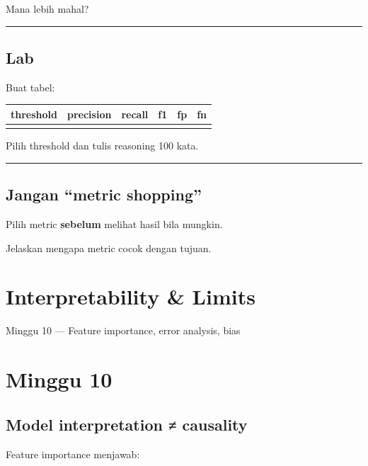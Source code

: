 \documentclass[
  indonesian,
  letterpaper,
  DIV=11,
  numbers=noendperiod]{scrreprt}
\newcounter{none} %
\begin{document}
Mana lebih mahal?

\begin{center}\rule{0.5\linewidth}{0.5pt}\end{center}

\section{Lab}\label{lab-5}

Buat tabel:

{\def\LTcaptype{none} %
\begin{longtable}[]{@{}rrrrrr@{}}
\toprule\noalign{}
threshold & precision & recall & f1 & fp & fn \\
\midrule\noalign{}
\endhead
\bottomrule\noalign{}
\endlastfoot
\end{longtable}
}

Pilih threshold dan tulis reasoning 100 kata.

\begin{center}\rule{0.5\linewidth}{0.5pt}\end{center}

\section{Jangan ``metric shopping''}\label{jangan-metric-shopping}

Pilih metric \textbf{sebelum} melihat hasil bila mungkin.

Jelaskan mengapa metric cocok dengan tujuan.

\chapter{Interpretability \& Limits}\label{interpretability-limits}

Minggu 10 --- Feature importance, error analysis, bias

\hfill\break

\chapter{Minggu 10}\label{minggu-10}

\section{Model interpretation ≠
causality}\label{model-interpretation-causality}

Feature importance menjawab:
\end{document}
